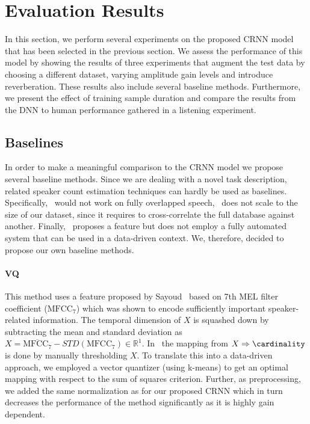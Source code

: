 \section{Evaluation Results}%
\label{sec:evaluation}
In this section, we perform several experiments on the proposed CRNN model that has been selected in the previous section.
We assess the performance of this model by showing the results of three experiments that augment the test data by
choosing a different dataset, varying amplitude gain levels and introduce reverberation.
These results also include several baseline methods.
Furthermore, we present the effect of training sample duration and compare the results from the DNN to human performance gathered in a listening experiment.

\subsection{Baselines}%
\label{ssec:baselines}
In order to make a meaningful comparison to the CRNN model we propose several baseline methods.
Since we are dealing with a novel task description, related speaker count estimation techniques can hardly be used as baselines.
Specifically,~\cite{xu13} would not work on fully overlapped speech,~\cite{andrei15} does not scale to the size of our dataset, since it requires to cross-correlate the full database against another.
Finally,~\cite{sayoud10} proposes a feature but does not employ a fully automated system that can be used in a data-driven context.
We, therefore, decided to propose our own baseline methods.

\paragraph*{\textbf{VQ}}
This method uses a feature proposed by Sayoud~\cite{sayoud10} based on 7th MEL filter coefficient (\(\mbox{MFCC}_7\)) which was shown to encode sufficiently important speaker-related information.
The temporal dimension of \(X\) is squashed down by subtracting the mean and standard deviation as \(X = \overline{\mbox{MFCC}_7} - STD(\mbox{MFCC}_7) \in \mathbb{R}^{1}\).
In~\cite{sayoud10} the mapping from \(X \Rightarrow \cardinality \) is done by manually thresholding \(X\).
To translate this into a data-driven approach, we employed a vector quantizer (using k-means) to get an optimal mapping with respect to the sum of squares criterion.
Further, as preprocessing, we added the same normalization as for our proposed CRNN which in turn decreases the performance of the method significantly as it is highly gain dependent.


